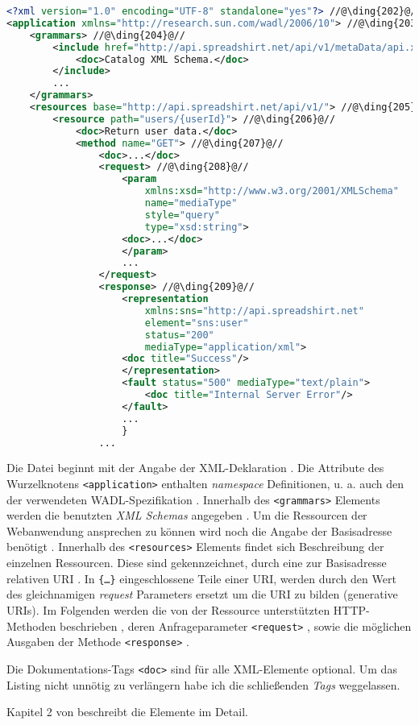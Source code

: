 \begin{minipage}{\textwidth}
\begin{lstlisting}[language=XML, caption={Beispielaufbau einer WADL-Datei anhand der Spreadshirt-API Beschreibung}, label=lst:wadlstructure, name=wadlstructure]
<?xml version="1.0" encoding="UTF-8" standalone="yes"?> //@\ding{202}@//
<application xmlns="http://research.sun.com/wadl/2006/10"> //@\ding{203}@//
    <grammars> //@\ding{204}@//
        <include href="http://api.spreadshirt.net/api/v1/metaData/api.xsd">
            <doc>Catalog XML Schema.</doc>
        </include>
        ...
    </grammars>
    <resources base="http://api.spreadshirt.net/api/v1/"> //@\ding{205}@//
        <resource path="users/{userId}"> //@\ding{206}@//
            <doc>Return user data.</doc>
            <method name="GET"> //@\ding{207}@//
                <doc>...</doc>
                <request> //@\ding{208}@//
                    <param 
                        xmlns:xsd="http://www.w3.org/2001/XMLSchema" 
                        name="mediaType" 
                        style="query" 
                        type="xsd:string">
                    <doc>...</doc>
                    </param>
                    ...
                </request>
                <response> //@\ding{209}@//
                    <representation 
                        xmlns:sns="http://api.spreadshirt.net"
                        element="sns:user" 
                        status="200" 
                        mediaType="application/xml">
                    <doc title="Success"/>
                    </representation>
                    <fault status="500" mediaType="text/plain">
                        <doc title="Internal Server Error"/>
                    </fault>
                    ...
                    }
                ...
\end{lstlisting}
\end{minipage}

Die Datei beginnt mit der Angabe der XML-Deklaration .
Die Attribute des Wurzelknotens \texttt{<application>} enthalten \emph{namespace} Definitionen, u. a. auch den der verwendeten WADL-Spezifikation .
Innerhalb des \texttt{<grammars>} Elements werden die benutzten \emph{XML Schemas} angegeben . 
Um die Ressourcen der Webanwendung ansprechen zu können wird noch die Angabe der Basisadresse benötigt . 
Innerhalb des \texttt{<resources>} Elements findet sich Beschreibung der einzelnen Ressourcen. Diese sind gekennzeichnet, durch eine zur Basisadresse relativen \gls{URI} . In \texttt{\{\ldots\}} eingeschlossene Teile einer \gls{URI}, werden durch den Wert des gleichnamigen \emph{request} Parameters ersetzt um die URI zu bilden (generative URIs).
Im Folgenden werden die von der Ressource unterstützten HTTP-Methoden beschrieben , deren Anfrageparameter \texttt{<request>} , sowie die möglichen Ausgaben der Methode \texttt{<response>} .

Die Dokumentations-Tags \texttt{<doc>} sind für alle XML-Elemente optional.
Um das Listing nicht unnötig zu verlängern habe ich die schließenden \emph{Tags} weggelassen.

Kapitel 2 von \cite{hadleyWADL} beschreibt die Elemente im Detail.


